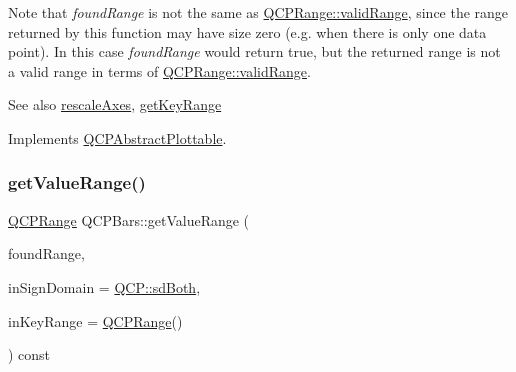 Note that {\itshape found\+Range} is not the same as \hyperlink{class_q_c_p_range_ab38bd4841c77c7bb86c9eea0f142dcc0}{Q\+C\+P\+Range\+::valid\+Range}, since the range returned by this function may have size zero (e.\+g. when there is only one data point). In this case {\itshape found\+Range} would return true, but the returned range is not a valid range in terms of \hyperlink{class_q_c_p_range_ab38bd4841c77c7bb86c9eea0f142dcc0}{Q\+C\+P\+Range\+::valid\+Range}.

\begin{DoxySeeAlso}{See also}
\hyperlink{class_q_c_p_abstract_plottable_a1491c4a606bccd2d09e65e11b79eb882}{rescale\+Axes}, \hyperlink{class_q_c_p_bars_ac5a3854774d9d9cd129b1eae1426de2d}{get\+Key\+Range} 
\end{DoxySeeAlso}


Implements \hyperlink{class_q_c_p_abstract_plottable_a4de773988b21ed090fddd27c6a3a3dcb}{Q\+C\+P\+Abstract\+Plottable}.

\mbox{\label{class_q_c_p_bars_a02cee4bf94d48a1e5f6fc185d9a10477}} 
\subsubsection{\texorpdfstring{get\+Value\+Range()}{getValueRange()}\hspace{0.1cm}{\footnotesize\ttfamily [2/2]}}
{\footnotesize\ttfamily \hyperlink{class_q_c_p_range}{Q\+C\+P\+Range} Q\+C\+P\+Bars\+::get\+Value\+Range (\begin{DoxyParamCaption}\item[{bool \&}]{found\+Range,  }\item[{\hyperlink{namespace_q_c_p_afd50e7cf431af385614987d8553ff8a9}{Q\+C\+P\+::\+Sign\+Domain}}]{in\+Sign\+Domain = {\ttfamily \hyperlink{namespace_q_c_p_afd50e7cf431af385614987d8553ff8a9a3dee7e9cd2fedce9253b83e172626a6c}{Q\+C\+P\+::sd\+Both}},  }\item[{const \hyperlink{class_q_c_p_range}{Q\+C\+P\+Range} \&}]{in\+Key\+Range = {\ttfamily \hyperlink{class_q_c_p_range}{Q\+C\+P\+Range}()} }\end{DoxyParamCaption}) const\hspace{0.3cm}{\ttfamily [virtual]}}

